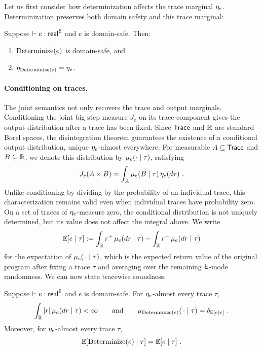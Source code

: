 Let us first consider how determinization affects the trace marginal
$\eta_{e}$. Determinization preserves both domain safety and this trace
marginal:

\begin{lemma}
\label{lem:trace-preservation}
Suppose $\vdash e:\mathsf{real}^{\mathsf{E}}$ and $e$ is domain-safe. Then:
%
\begin{enumerate}
  \item $\operatorname{Determinize}(e)$ is domain-safe, and
  \item $\eta_{\operatorname{Determinize}(e)}=\eta_{e}$.
\end{enumerate}
\end{lemma}

\paragraph{Conditioning on traces.}
The joint semantics not only recovers the trace and output marginals.
Conditioning the joint big-step measure $J_e$ on its trace component
gives the output distribution after a trace has been fixed. Since
$\mathsf{Trace}$ and $\mathbb{R}$ are standard Borel spaces, the disintegration
theorem guarantees the existence of a conditional output distribution,
unique $\eta_{e}$-almost everywhere. For measurable $A\subseteq\mathsf{Trace}$ and $B\subseteq\mathbb{R}$, we denote this distribution by
$\mu_{e}(\cdot\mid\tau)$, satisfying
\begin{align}\label{eq:disintegration}
  J_e(A\times B)
  =\int_A\mu_{e}(B\mid\tau)\,\eta_{e}(d\tau)~.
\end{align} 
Unlike conditioning by dividing by the probability of an individual trace,
this characterization remains valid even when individual traces have
probability zero. On a set of traces of $\eta_{e}$-measure zero, the
conditional distribution is not uniquely determined, but its value
does not affect the integral above. We write
\begin{align*}
  \mathbb{E}[e\mid\tau]
  :=\int_{\mathbb{R}}r^+\,\mu_{e}(dr\mid\tau)
  -\int_{\mathbb{R}}r^-\,\mu_{e}(dr\mid\tau)
\end{align*}
for the expectation of $\mu_{e}(\,\cdot\mid\tau)$, which is the expected
return value of the original program after fixing a trace $\tau$ and
averaging over the remaining $\mathsf{E}$-mode randomness. We can now state
tracewise soundness.

\begin{theorem}
\label{thm:trace-soundness}
Suppose $\vdash e:\mathsf{real}^{\mathsf{E}}$ and $e$ is domain-safe.
For $\eta_{e}$-almost every trace $\tau$,
\[
  \int_{\mathbb{R}}|r|\,\mu_{e}(dr\mid\tau)<\infty
  \qquad\text{and}\qquad
  \mu_{\operatorname{Determinize}(e)}(\,\cdot\mid\tau)
  =\delta_{\mathbb{E}[e\mid\tau]}~.
\]
Moreover, for $\eta_{e}$-almost every trace $\tau$,
\[
  \mathbb{E}[\operatorname{Determinize}(e)\mid\tau]=\mathbb{E}[e\mid\tau]~.
\]
\end{theorem}

